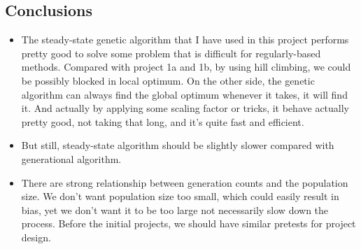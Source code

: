 \documentclass[b5paper,11pt, abstraction, titlepage]{scrartcl}
\begin{document}
\begin{CJK}{UTF8}{gbsn}
\section{Conclusions}
\begin{itemize}
\itemsep=-3pt
\item The steady-state genetic algorithm that I have used in this project performs pretty good to solve some problem that is difficult for regularly-based methods. Compared with project 1a and 1b, by using hill climbing, we could be possibly blocked in local optimum. On the other side, the genetic algorithm can always find the global optimum whenever it takes, it will find it. And actually by applying some scaling factor or tricks, it behave actually pretty good, not taking that long, and it's quite fast and efficient. 
\item But still, steady-state algorithm should be slightly slower compared with generational algorithm.
\item There are strong relationship between generation counts and the population size. We don't want population size too small, which could easily result in bias, yet we don't want it to be too large not necessarily slow down the process. Before the initial projects, we should have similar pretests for project design.
\end{itemize}


\end{CJK}
\end{document}
